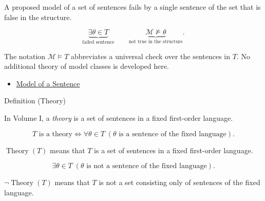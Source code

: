 \begin{remark*}
A proposed model of a set of sentences fails by a single sentence of the set
that is false in the structure.
\end{remark*}

\begin{remark*}
\[
\underbrace{\exists \theta\in T}_{\text{failed sentence}}
\qquad
\underbrace{\mathcal M\not\models\theta}_{\text{not true in the structure}}.
\]
\end{remark*}

\begin{remark*}[Interpretation]
The notation \(\mathcal M\models T\) abbreviates a universal check over the
sentences in \(T\). No additional theory of model classes is developed here.
\end{remark*}

\begin{dependencies}
\begin{itemize}
  \item \hyperref[def:model]{Model of a Sentence}
\end{itemize}
\end{dependencies}

\begin{definitionbox}{Definition (Theory)}
\begin{definition}[Theory]
\label{def:theory}
In Volume I, a \emph{theory} is a set of sentences in a fixed first-order
language.
\end{definition}
\end{definitionbox}

\begin{remark*}
\[
T \text{ is a theory}
\Longleftrightarrow
\forall \theta\in T\;(\theta \text{ is a sentence of the fixed language}).
\]
\end{remark*}

\begin{remark*}
\(\operatorname{Theory}(T)\) means that \(T\) is a set of sentences in a fixed
first-order language.
\end{remark*}

\begin{remark*}
\[
\exists \theta\in T\;(\theta \text{ is not a sentence of the fixed language}).
\]
\end{remark*}

\begin{remark*}
\(\neg\operatorname{Theory}(T)\) means that \(T\) is not a set consisting only
of sentences of the fixed language.
\end{remark*}

